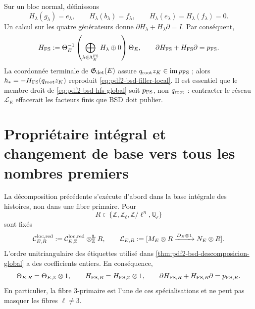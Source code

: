 Sur un bloc normal, définissons
\begin{equation}\label{eq:pdf2-bsd-hfs-generadores}
 H_\lambda(g_\lambda)=e_\lambda,
 \qquad H_\lambda(b_\lambda)=f_\lambda,
 \qquad H_\lambda(e_\lambda)=H_\lambda(f_\lambda)=0.
\end{equation}
Un calcul sur les quatre générateurs donne
$\partial H_\lambda+H_\lambda\partial=I$. Par conséquent,
\begin{equation}\label{eq:pdf2-bsd-hfs-global}
 H_{\rm FS}:=\Theta_E^{-1}
 \left(\bigoplus_{\lambda\in\Lambda_E^{\rm FS}}H_\lambda\oplus0\right)
 \Theta_E,
 \qquad
 \partial H_{\rm FS}+H_{\rm FS}\partial=p_{\rm FS}.
\end{equation}
La coordonnée terminale de $\mathfrak G_{\rm det}(E)$ assure
$q_{\rm root}z_K\in\operatorname{im}p_{\rm FS}$ ; alors
$h_*=-H_{\rm FS}(q_{\rm root}z_K)$ reproduit
\eqref{eq:pdf2-bsd-filler-local}. Il est essentiel que le membre droit de
\eqref{eq:pdf2-bsd-hfs-global} soit $p_{\rm FS}$, non $q_{\rm root}$ :
contracter le réseau $\mathcal L_E$ effacerait les facteurs finis que BSD
doit publier.

\section{Propriétaire intégral et changement de base vers tous les nombres premiers}

La décomposition précédente s'exécute d'abord dans la base intégrale des
histoires, non dans une fibre primaire. Pour
\[
 R\in\{\mathbb Z,\mathbb Z_\ell,\mathbb Z/\ell^n,
          \mathbb Q_\ell\}
\]
sont fixés
\begin{equation}\label{eq:pdf2-bsd-complejos-base-change}
 \mathcal C_{E,R}^{\rm loc,red}:=
 \mathcal C_{E,\mathbb Z}^{\rm loc,red}
       \otimes_{\mathbb Z}^{\mathbf L}R,
 \qquad
 \mathcal L_{E,R}:=
 [M_E\otimes R\xrightarrow{D_E\otimes1}N_E\otimes R].
\end{equation}
L'ordre unitriangulaire des étiquettes utilisé dans
\cref{thm:pdf2-bsd-descomposicion-global} a des coefficients entiers. En
conséquence,
\begin{equation}\label{eq:pdf2-bsd-theta-base-change}
 \Theta_{E,R}=\Theta_{E,\mathbb Z}\otimes1,
 \qquad
 H_{{\rm FS},R}=H_{{\rm FS},\mathbb Z}\otimes1,
 \qquad
 \partial H_{{\rm FS},R}+H_{{\rm FS},R}\partial=p_{{\rm FS},R}.
\end{equation}
En particulier, la fibre $3$-primaire est l'une de ces spécialisations et ne
peut pas masquer les fibres $\ell\ne3$.

